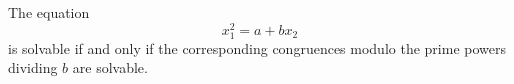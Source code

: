\begin{proposition}\label{eq:022}
    The equation
\[
    x_1^2=a+bx_2
\]
    is solvable if and only if the corresponding congruences modulo the prime powers dividing $b$ are solvable.
\end{proposition}
